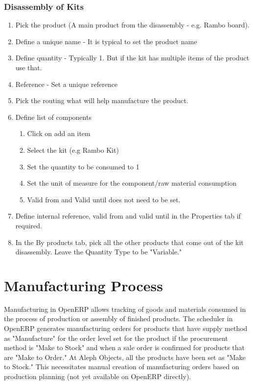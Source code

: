 \subsubsection{Disassembly of Kits}
\begin{enumerate}
\item Pick the product (A main product from the disassembly - e.g. Rambo board).
\item Define a unique name - It is typical to set the product name
\item Define quantity - Typically 1. But if the kit has multiple items of the product use that.
\item Reference - Set a unique reference
\item Pick the routing what will help manufacture the product.
\item Define list of components
  \begin{enumerate}
  \item Click on add an item
  \item Select the kit (e.g Rambo Kit)
  \item Set the quantity to be consumed to 1
  \item Set the unit of measure for the component/raw material consumption
  \item Valid from and Valid until does not need to be set. 
  \end{enumerate}
\item Define internal reference, valid from and valid until in the Properties tab if required.
\item In the By products tab, pick all the other products that come out of the kit disassembly. Leave the Quantity Type to be "Variable."
\end{enumerate}

\section{Manufacturing Process}

Manufacturing in OpenERP allows tracking of goods and materials consumed in the process of production or assembly of finished products. The scheduler in OpenERP generates manufacturing orders for products that have supply method as "Manufacture" for the order level set for the product if the procurement method is "Make to Stock" and when a sale order is confirmed for products that are "Make to Order."
At Aleph Objects, all the products have been set as "Make to Stock." This necessitates manual creation of manufacturing orders based on production planning (not yet available on OpenERP directly). 

